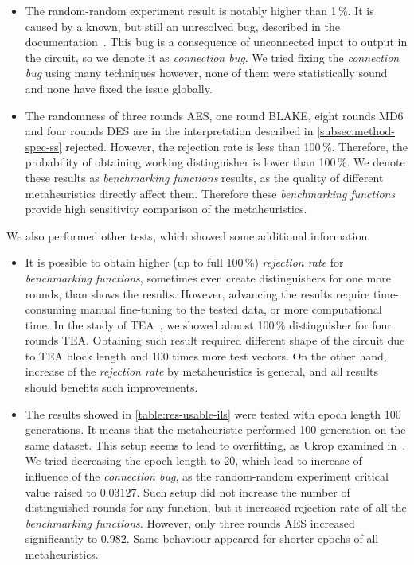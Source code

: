 \documentclass[
  print, %
  Table,   %
  nolof,     %
  nolot,     %
  11pt, %
  oneside  %
]{fithesis3}
\begin{document}
\begin{itemize}
    \item The random-random experiment result is notably higher than 1\,\%. It is caused by a known, but still an unresolved bug, described in the documentation~\cite{EACirc-wiki-bug}. This bug is a consequence of unconnected input to output in the circuit, so we denote it as \textit{connection bug}. We tried fixing the \textit{connection bug} using many techniques however, none of them were statistically sound and none have fixed the issue globally.
    \item The randomness of three rounds AES, one round BLAKE, eight rounds MD6 and four rounds DES are in the interpretation described in \cref{subsec:method-spec-ss} rejected. However, the rejection rate is less than 100\,\%. Therefore, the probability of obtaining working distinguisher is lower than 100\,\%. We denote these results as \textit{benchmarking functions} results, as the quality of different metaheuristics directly affect them. Therefore these \textit{benchmarking functions} provide high sensitivity comparison of the metaheuristics.
\end{itemize}

We also performed other tests, which showed some additional information.

\begin{itemize}
    \item It is possible to obtain higher (up to full 100\,\%) \textit{rejection rate} for \textit{benchmarking functions}, sometimes even create distinguishers for one more rounds, than shows the results. However, advancing the results require time-consuming manual fine-tuning to the tested data, or more computational time. In the study of TEA~\cite{kubicek2016new}, we showed almost 100\,\% distinguisher for four rounds TEA. Obtaining such result required different shape of the circuit due to TEA block length and 100 times more test vectors. On the other hand, increase of the \textit{rejection rate} by metaheuristics is general, and all results should benefits such improvements.
    
    \item The results showed in \cref{table:res-usable-ils} were tested with epoch length 100 generations. It means that the metaheuristic performed 100 generation on the same dataset. This setup seems to lead to overfitting, as Ukrop examined in~\cite[section~7.1]{ukropBcThesis}. We tried decreasing the epoch length to 20, which lead to increase of influence of the \textit{connection bug}, as the random-random experiment critical value raised to $0.03127$. Such setup did not increase the number of distinguished rounds for any function, but it increased rejection rate of all the \textit{benchmarking functions}. However, only three rounds AES increased significantly to $0.982$. Same behaviour appeared for shorter epochs of all metaheuristics.
\end{itemize}
\end{document}
